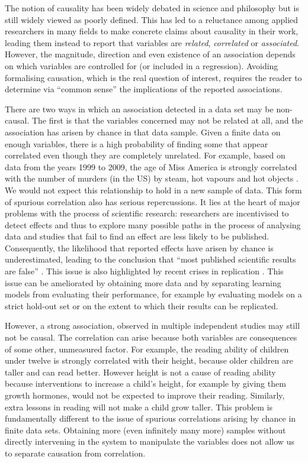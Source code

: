 \documentclass[11pt,a4paper,twoside]{report}
\newcommand{\quotes}[1]{``#1''}
\theoremstyle{plain}
\theoremstyle{definition}
\begin{document}
The notion of causality has been widely debated in science and philosophy \citep{hume1741treatise,mill1893system,pearson1911grammar,Pearl2000,Lewis2000,woodward2005making,heckman20051,cartwright2007hunting} but is still widely viewed as poorly defined. This has led to a reluctance among applied researchers in many fields to make concrete claims about causality in their work, leading them instead to report that variables are \textit{related}, \textit{correlated} or \textit{associated}. However, the magnitude, direction and even existence of an association depends on which variables are controlled for (or included in a regression). Avoiding formalising causation, which is the real question of interest, requires the reader to determine via \quotes{common sense} the implications of the reported associations.

There are two ways in which an association detected in a data set may be non-causal. The first is that the variables concerned may not be related at all, and the association has arisen by chance in that data sample. Given a finite data on enough variables, there is a high probability of finding some that appear correlated even though they are completely unrelated. For example, based on data from the years 1999 to 2009, the age of Miss America is strongly correlated with the number of murders  (in the US) by steam, hot vapours and hot objects \citep{Vigen2015}. We would not expect this relationship to hold in a new sample of data. This form of spurious correlation also has serious repercussions. It lies at the heart of major problems with the process of scientific research: researchers are incentivised to detect effects and thus to explore many possible paths in the process of analysing data and studies that fail to find an effect are less likely to be published. Consequently, the likelihood that reported effects have arisen by chance is underestimated, leading to the conclusion that \quotes{most published scientific results are false} \citep{Ioannidis2005}. This issue is also highlighted by recent crises in replication \citep{OpenScienceCollaboration2015}. This issue can be ameliorated by obtaining more data and by separating learning models from evaluating their performance, for example by evaluating models on a strict hold-out set or on the extent to which their results can be replicated. 

However, a strong association, observed in multiple independent studies may still not be causal. The correlation can arise because both variables are consequences of some other, unmeasured factor. For example, the reading ability of children under twelve is strongly correlated with their height, because older children are taller and can read better. However height is not a cause of reading ability because interventions to increase a child's height, for example by giving them growth hormones, would not be expected to improve their reading. Similarly, extra lessons in reading will not make a child grow taller. This problem is fundamentally different to the issue of spurious correlations arising by chance in finite data sets. Obtaining more (even infinitely many more) samples without directly intervening in the system to manipulate the variables does not allow us to separate causation from correlation. 
\end{document}
